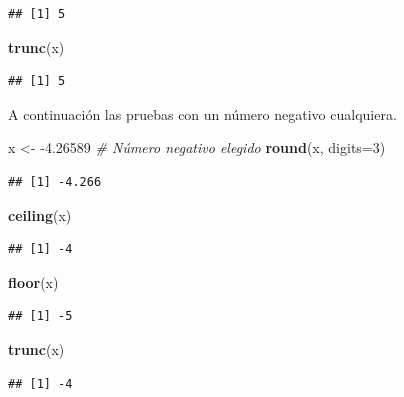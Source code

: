 \documentclass[10pt,]{krantz}
\makeatletter
\newenvironment{Shaded}{\begin{snugshade}}{\end{snugshade}}
\newcommand{\KeywordTok}[1]{\textcolor[rgb]{0.13,0.29,0.53}{\textbf{{#1}}}}
\newcommand{\DataTypeTok}[1]{\textcolor[rgb]{0.13,0.29,0.53}{{#1}}}
\newcommand{\DecValTok}[1]{\textcolor[rgb]{0.00,0.00,0.81}{{#1}}}
\newcommand{\FloatTok}[1]{\textcolor[rgb]{0.00,0.00,0.81}{{#1}}}
\newcommand{\StringTok}[1]{\textcolor[rgb]{0.31,0.60,0.02}{{#1}}}
\newcommand{\CommentTok}[1]{\textcolor[rgb]{0.56,0.35,0.01}{\textit{{#1}}}}
\newcommand{\NormalTok}[1]{{#1}}
\newenvironment{kframe}{%
\medskip{}
\setlength{\fboxsep}{.8em}
 \def\at@end@of@kframe{}%
 \ifinner\ifhmode%
  \def\at@end@of@kframe{\end{minipage}}%
  \begin{minipage}{\columnwidth}%
 \fi\fi%
 \def\FrameCommand##1{\hskip\@totalleftmargin \hskip-\fboxsep
 \colorbox{shadecolor}{##1}\hskip-\fboxsep
     \hskip-\linewidth \hskip-\@totalleftmargin \hskip\columnwidth}%
 \MakeFramed {\advance\hsize-\width
   \@totalleftmargin\z@ \linewidth\hsize
   \@setminipage}}%
 {\par\unskip\endMakeFramed%
 \at@end@of@kframe}
\renewenvironment{Shaded}{\begin{kframe}}{\end{kframe}}
\makeatother
\begin{document}
\begin{verbatim}
## [1] 5
\end{verbatim}

\begin{Shaded}
\begin{Highlighting}[]
\KeywordTok{trunc}\NormalTok{(x)}
\end{Highlighting}
\end{Shaded}

\begin{verbatim}
## [1] 5
\end{verbatim}

A continuación las pruebas con un número negativo cualquiera.

\begin{Shaded}
\begin{Highlighting}[]
\NormalTok{x <-}\StringTok{ }\NormalTok{-}\FloatTok{4.26589}  \CommentTok{# Número negativo elegido}
\KeywordTok{round}\NormalTok{(x, }\DataTypeTok{digits=}\DecValTok{3}\NormalTok{)}
\end{Highlighting}
\end{Shaded}

\begin{verbatim}
## [1] -4.266
\end{verbatim}

\begin{Shaded}
\begin{Highlighting}[]
\KeywordTok{ceiling}\NormalTok{(x)}
\end{Highlighting}
\end{Shaded}

\begin{verbatim}
## [1] -4
\end{verbatim}

\begin{Shaded}
\begin{Highlighting}[]
\KeywordTok{floor}\NormalTok{(x)}
\end{Highlighting}
\end{Shaded}

\begin{verbatim}
## [1] -5
\end{verbatim}

\begin{Shaded}
\begin{Highlighting}[]
\KeywordTok{trunc}\NormalTok{(x)}
\end{Highlighting}
\end{Shaded}

\begin{verbatim}
## [1] -4
\end{verbatim}
\end{document}
